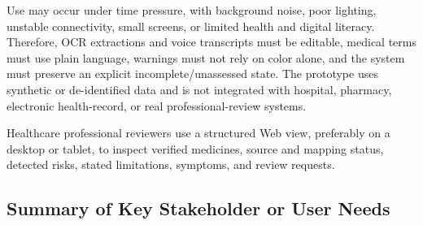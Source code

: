 Use may occur under time pressure, with background noise, poor lighting,
unstable connectivity, small screens, or limited health and digital literacy.
Therefore, OCR extractions and voice transcripts must be editable, medical
terms must use plain language, warnings must not rely on color alone, and the
system must preserve an explicit incomplete/unassessed state. The prototype
uses synthetic or de-identified data and is not integrated with hospital,
pharmacy, electronic health-record, or real professional-review systems.

Healthcare professional reviewers use a structured Web view, preferably on a
desktop or tablet, to inspect verified medicines, source and mapping status,
detected risks, stated limitations, symptoms, and review requests.

\subsection{Summary of Key Stakeholder or User Needs}

